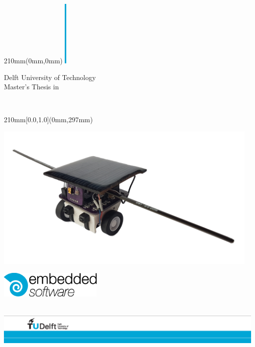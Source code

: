 
\begin {textblock*}{210mm}(0mm,0mm)
\noindent
\includegraphics[height=3.2cm]{pics/block}
\sffamily
\vspace{.8cm}
\begin{center}
\Large
Delft University of Technology\\
Master's Thesis in \reportMSC\\
\vspace{2cm}
\parbox{170mm}{\bfseries\centering\Huge\reportTitle}\\
\vspace{1cm}
\parbox{170mm}{\bfseries\centering\reportAuthor}

\end{center}
\end{textblock*}


\begin {textblock*}{210mm}[0.0,1.0](0mm,297mm)
\noindent

\hfill\parbox{15.5cm}{
\includegraphics[width=13cm]{pics/tp_robot.png}
}
\vspace*{4cm}

\noindent
\hspace{1.89cm}
\hfill\parbox{5cm}{
\includegraphics[width=5cm]{pics/es_logo_cyan_black_rgb}}
\hspace*{2cm}\\

\vspace*{1.5cm}
\noindent
\includegraphics[width=\textwidth]{pics/TU_border_A4_L_front}
\end{textblock*}

\null\newpage
